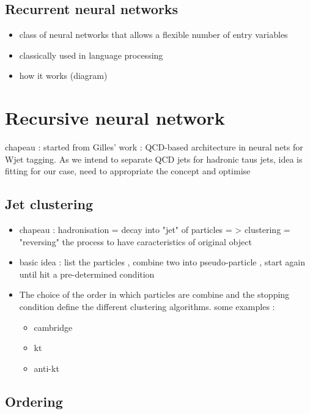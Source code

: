 \subsection{Recurrent neural networks}

\begin{itemize}
    \item class of neural networks that allows a flexible number of entry variables
    \item classically used in language processing
    \item how it works (diagram)
\end{itemize}

\section{Recursive neural network}

chapeau : started from Gilles' work : QCD-based architecture in neural nets for Wjet tagging. As we intend to separate QCD jets for hadronic taus jets, idea is fitting for our case, need to appropriate the concept and optimise

\subsection{Jet clustering}

\begin{itemize}
    \item chapeau : hadronisation = decay into "jet" of particles = > clustering = "reversing" the process to have caracteristics of original object
    \item basic idea : list the particles , combine two into pseudo-particle , start again until hit a pre-determined condition
    \item  The choice of the order in which particles are combine and the stopping condition define the different clustering algorithms. some examples :



\begin{itemize}
    \item cambridge
    \item kt
    \item anti-kt
\end{itemize}

\end{itemize}

\subsection{Ordering}

